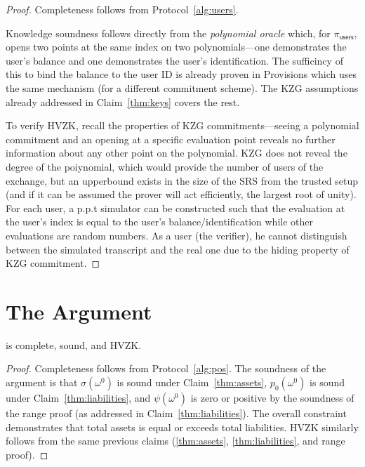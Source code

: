 \begin{proof}
Completeness follows from Protocol~\ref{alg:users}. 

Knowledge soundness follows directly from the \textit{polynomial oracle} which, for $\pi_\mathsf{users}$, opens two points at the same index on two polynomials---one demonstrates the user's balance and one demonstrates the user's identification. The sufficincy of this to bind the balance to the user ID is already proven in Provisions which uses the same mechanism (for a different commitment scheme). The KZG assumptions already addressed in Claim~\ref{thm:keys} covers the rest. 

To verify HVZK, recall the properties of KZG commitments---seeing a polynomial commitment and an opening at a specific evaluation point reveals no further information about any other point on the polynomial. KZG does not reveal the degree of the poiynomial, which would provide the number of users of the exchange, but an upperbound exists in the size of the SRS from the trusted setup (and if it can be assumed the prover will act efficiently, the largest root of unity). For each user, a p.p.t simulator can be constructed such that the evaluation at the user's index is equal to the user's balance/identification while other evaluations are random numbers. As a user (the verifier), he cannot distinguish between the simulated transcript and the real one due to the hiding property of KZG commitment. \end{proof}


\section{The \pos Argument}


\begin{claim}
\label{thm:solvency} 
\pos is complete, sound, and HVZK. 
\end{claim}

\begin{proof}
Completeness follows from Protocol~\ref{alg:pos}. The soundness of the argument is that $\sigma(\omega^0)$ is sound under Claim~\ref{thm:assets}, $p_0(\omega^0)$ is sound under Claim~\ref{thm:liabilities}, and $\psi(\omega^0)$ is zero or positive by the soundness of the range proof (as addressed in Claim~\ref{thm:liabilities}). The overall constraint demonstrates that total assets is equal or exceeds total liabilities. HVZK similarly follows from the same previous claims (\ref{thm:assets}, \ref{thm:liabilities}, and range proof).\end{proof}
